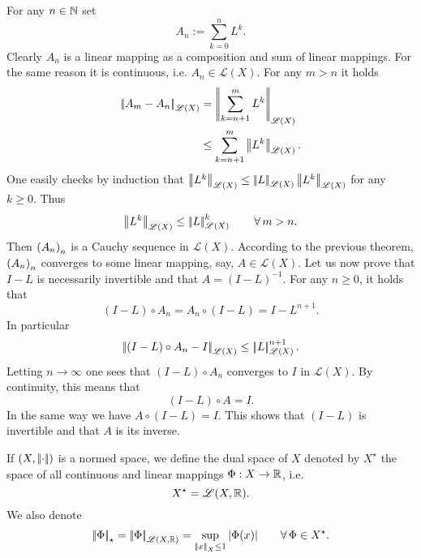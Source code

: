 \documentclass{article}
\begin{document}
\begin{fancyproof}
	For any $n\in\mathbb{N}$ set
	\begin{equation*}
		A_{n}:=\sum_{k=0}^{n}L^{k}.
	\end{equation*}
	Clearly $A_{n}$ is a linear mapping as a composition and sum of linear mappings. For the same reason it is continuous, i.e. $A_{n}\in\mathscr{L}(X)$. For any $m>n$ it holds
	\begin{align*}
		\left|\negthinspace\left|A_{m}-A_{n}\right|\negthinspace\right|_{\mathscr{L}(X)}&=\left|\negthinspace\left|\sum_{k=n+1}^{m}L^{k}\right|\negthinspace\right|_{\mathscr{L}(X)}\\
		&\leq\sum_{k=n+1}^{m}\left|\negthinspace\left|L^{k}\right|\negthinspace\right|_{\mathscr{L}(X)}.
	\end{align*}
	One easily checks by induction that $\left|\negthinspace\left|L^{k}\right|\negthinspace\right|_{\mathscr{L}(X)}\leq\left|\negthinspace\left|L\right|\negthinspace\right|_{\mathscr{L}(X)}\left|\negthinspace\left|L^{k}\right|\negthinspace\right|_{\mathscr{L}(X)}$ for any $k\geq 0$. Thus
	\begin{equation*}
		\left|\negthinspace\left|L^{k}\right|\negthinspace\right|_{\mathscr{L}(X)}\leq\left|\negthinspace\left|L\right|\negthinspace\right|^{k}_{\mathscr{L}(X)}\qquad\forall\, m>n.
	\end{equation*}
	Then ${\left({A}_{n}\right)}_{n}$ is a Cauchy sequence in $\mathscr{L}(X)$. According to the previous theorem, ${\left({A}_{n}\right)}_{n}$ converges to some linear mapping, say, $A\in\mathscr{L}(X)$. Let us now prove that $I-L$ is necessarily invertible and that $A=(I-L)^{-1}$. For any $n\geq 0$, it holds that
	\begin{equation*}
		(I-L)\circ A_{n}=A_{n}\circ(I-L)=I-L^{n+1}.
	\end{equation*}
	In particular
	\begin{equation*}
		\left|\negthinspace\left|(I-L)\circ A_{n}-I\right|\negthinspace\right|_{\mathscr{L}(X)}\leq\left|\negthinspace\left|L\right|\negthinspace\right|^{n+1}_{\mathscr{L}(X)}.
	\end{equation*}
	Letting $n\to\infty$ one sees that $(I-L)\circ A_{n}$ converges to $I$ in $\mathscr{L}(X)$. By continuity, this means that 
	\begin{equation*}
		(I-L)\circ A=I.
	\end{equation*}
	In the same way we have $A\circ(I-L)=I$. This shows that $(I-L)$ is invertible and that $A$ is its inverse.
\end{fancyproof}
\begin{definition}
	If $\left(X,\left|\negthinspace\left|\cdot\right|\negthinspace\right|\right)$ is a normed space, we define the dual space of $X$ denoted by $X^{\star}$ the space of all continuous and linear mappings $\Phi:X\to\mathbb{R}$, i.e.
	\begin{equation*}
		X^{\star}=\mathscr{L}(X,\mathbb{R}).
	\end{equation*}
	We also denote
	\begin{equation*}
		\left|\negthinspace\left|\Phi\right|\negthinspace\right|_{\star}=\left|\negthinspace\left|\Phi\right|\negthinspace\right|_{\mathscr{L}(X,\mathbb{R})}=\sup_{\left|\negthinspace\left|x\right|\negthinspace\right|_{X}\leq 1}|\Phi(x)|\qquad\forall\,\Phi\in X^{\star}.
	\end{equation*}
\end{definition}
\end{document}
